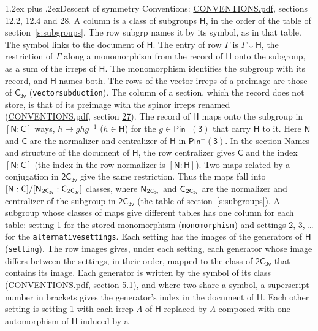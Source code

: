 \documentclass[10pt,a4paper]{article}
\makeatletter
\renewcommand\section{\@startsection{section}{1}{\z@}{-3ex plus -1ex minus -.2ex}%
  {1.2ex plus .2ex}{\normalfont\large\sffamily\bfseries\color{parttitle}}}
\numberwithin{equation}{section}
\newcommand{\grp}[1]{\mathsf{#1}}
\newcommand{\grpindex}[2]{[#1 : #2]}
\newcommand{\restr}[2]{#1\!\downarrow#2}
\newcommand{\hairsp}{\mkern1mu}
\makeatother
\begin{document}
\section{Descent of symmetry}\label{s:subduction}
Conventions: \href{../../CONVENTIONS.pdf}{CONVENTIONS.pdf}, sections \href{../../../rotation/CONVENTIONS.pdf\#conv.12.2}{12.2}, \href{../../../rotation/CONVENTIONS.pdf\#conv.12.4}{12.4} and \href{../../CONVENTIONS.pdf\#conv.28}{28}.
A column is a class of subgroups $\grp{H}$, in the order of the table of section~\ref{s:subgroups}. The row subgrp names it by its symbol, as in that table. The symbol links to the document of $\grp{H}$. The entry of row $\Gamma$ is $\restr{\Gamma}{\grp{H}}$, the restriction of $\Gamma$ along a monomorphism from the record of $\grp{H}$ onto the subgroup, as a sum of the irreps of $\grp{H}$. The monomorphism identifies the subgroup with its record, and $\grp{H}$ names both. The rows of the vector irreps of a preimage are those of \href{../../../rotation/data/pdf/C3v.pdf}{$\grp{C_{3v}}$} (\texttt{vectorsubduction}). The column of a section, which the record does not store, is that of its preimage with the spinor irreps renamed (\href{../../CONVENTIONS.pdf}{CONVENTIONS.pdf}, section \href{../../CONVENTIONS.pdf\#conv.27}{27}). \label{n:group.normalizer.o3}\label{n:group.centralizer.o3}\label{n:element.h}The record of $\grp{H}$ maps onto the subgroup in $\grpindex{\grp{N}}{\grp{C}}$ ways, $h \mapsto g h g^{-1}$ ($h \in \grp{H}$) for the $g \in \grp{Pin^{-}(3)}$ that carry $\grp{H}$ to it. Here $\grp{N}$ and $\grp{C}$ are the normalizer and centralizer of $\grp{H}$ in \href{Pinminus3.pdf}{$\grp{Pin^{-}(3)}$}. In the section Names and structure of the document of $\grp{H}$, the row centralizer gives $\grp{C}$ and the index $\grpindex{\grp{N}}{\grp{C}}$ (the index in the row normalizer is $\grpindex{\grp{N}}{\grp{H}}$). Two maps related by a conjugation in $\grp{2C_{3v}}$ give the same restriction. Thus the maps fall into $\grpindex{\grp{N}}{\grp{C}}/\grpindex{\grp{N}_{\hairsp \grp{2C_{3v}}}}{\grp{C}_{\hairsp \grp{2C_{3v}}}}$ classes, where $\grp{N}_{\hairsp \grp{2C_{3v}}}$ and $\grp{C}_{\hairsp \grp{2C_{3v}}}$ are the normalizer and centralizer of the subgroup in $\grp{2C_{3v}}$ (the table of section~\ref{s:subgroups}). \label{n:head.setting}A subgroup whose classes of maps give different tables has one column for each table: setting 1 for the stored monomorphism (\texttt{monomorphism}) and settings 2, 3, \dots{} for the \texttt{alternativesettings}. Each setting has the images of the generators of $\grp{H}$ (\texttt{setting}). \label{n:head.images}The row images gives, under each setting, each generator whose image differs between the settings, in their order, mapped to the class of $\grp{2C_{3v}}$ that contains its image. Each generator is written by the symbol of its class (\href{../../CONVENTIONS.pdf}{CONVENTIONS.pdf}, section \href{../../../rotation/CONVENTIONS.pdf\#conv.5.1}{5.1}), and where two share a symbol, a superscript number in brackets gives the generator's index in the document of $\grp{H}$. \label{n:irrep.Delta}Each other setting is setting 1 with each irrep $\Lambda$ of $\grp{H}$ replaced by $\Lambda$ composed with one automorphism of $\grp{H}$ induced by a 
\end{document}
